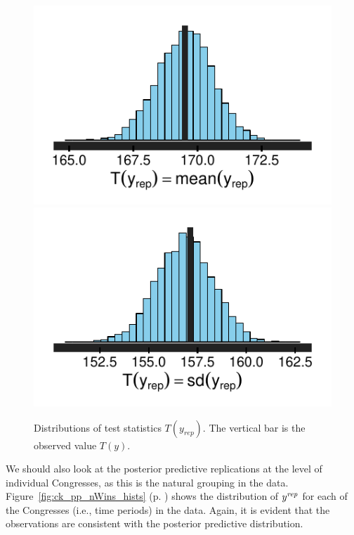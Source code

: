 \begin{figure}[h]
\centering
	\includegraphics[scale=0.7]{sections/figs/test_stats_mean}
	\includegraphics[scale=0.7]{sections/figs/test_stats_sd}
\caption{Distributions of test statistics $T(y_{rep})$. The vertical bar is the observed value $T(y)$.}
\label{fig:ck_pp_test_statistics}
\end{figure}


We should also look at the posterior predictive replications at the level of individual Congresses,
as this is the natural grouping in the data.  
Figure~\ref{fig:ck_pp_nWins_hists} (p. \pageref{fig:ck_pp_nWins_hists}) shows 
the distribution of $y^{\it rep}$ for each of the Congresses (i.e., time periods) in the data. 
Again, it is evident that the observations are consistent with the posterior predictive distribution.

